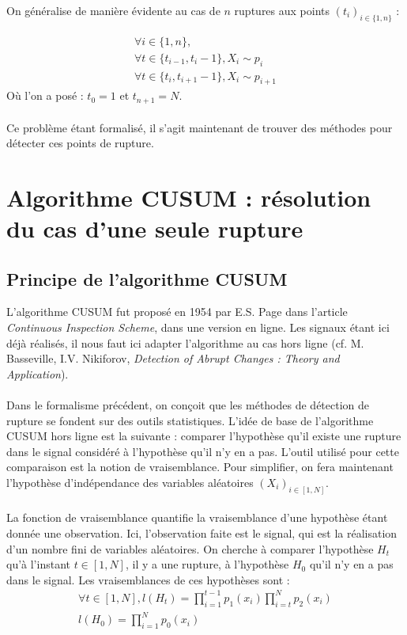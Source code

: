 \documentclass[french,12pt,notitlepage]{report}
\begin{document}
	On généralise de manière évidente au cas de $n$ ruptures aux points $(t_i)_{i \in \{1, n\}}$ :

	\begin{equation}
	\begin{array}{lll}
		\forall i \in \{1, n\}, \\
		\forall t \in \{t_{i-1}, t_i-1\}, X_i \sim p_i \\
		\forall t \in \{t_i, t_{i+1}-1\}, X_i \sim p_{i+1}
	\end{array}
	\label{multi_rupt}
	\end{equation}
	Où l'on a posé : $t_0 = 1$ et $t_{n+1} = N$.
	\\ \\
	Ce problème étant formalisé, il s'agit maintenant de trouver des méthodes pour détecter ces points de rupture.

	\chapter{Algorithme CUSUM : résolution du cas d'une seule rupture}


	\section{Principe de l'algorithme CUSUM}
	L'algorithme CUSUM fut proposé en 1954 par E.S. Page dans l'article \textit{Continuous Inspection Scheme}, dans une version en ligne. Les signaux étant ici déjà réalisés, il nous faut ici adapter l'algorithme au cas hors ligne (cf. M. Basseville, I.V. Nikiforov, \textit{Detection of Abrupt Changes : Theory and Application}).
	\\ \\
	Dans le formalisme précédent, on conçoit que les méthodes de détection de rupture se fondent sur des outils statistiques. L'idée de base de l'algorithme CUSUM hors ligne est la suivante : comparer l'hypothèse qu'il existe une rupture dans le signal considéré à l'hypothèse qu'il n'y en a pas. L'outil utilisé pour cette comparaison est la notion de vraisemblance. Pour simplifier, on fera maintenant l'hypothèse d'indépendance des variables aléatoires $(X_i)_{i \in [1,N]}$.
	\\ \\
	La fonction de vraisemblance quantifie la vraisemblance d'une hypothèse étant donnée une observation. Ici, l'observation faite est le signal, qui est la réalisation d'un nombre fini de variables aléatoires. On cherche à comparer l'hypothèse $H_t$ qu'à l'instant $t \in [1, N]$, il y a une rupture, à l'hypothèse $H_0$ qu'il n'y en a pas dans le signal. Les vraisemblances de ces hypothèses sont :
	\begin{equation}
	\begin{array}{ll}
		\forall t \in [1, N],l(H_t) = \prod_{i = 1}^{t-1} p_1(x_i) \prod_{i = t}^{N} p_2(x_i) \\
		l(H_0) = \prod_{i = 1}^N p_0(x_i) \\
	\end{array}	
	\end{equation}
\end{document}
